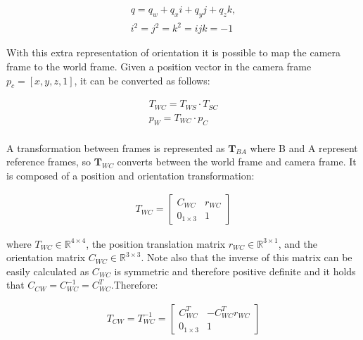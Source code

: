 \documentclass[11pt,twoside]{report}
\begin{document}
\begin{equation}
\begin{aligned}
\label{quaternion}
q = q_{w} + q_{x}i + q_{y}j+q_{z}k, \\
i^{2}=j^{2}=k^{2}=ijk=-1
\end{aligned}
\end{equation}

With this extra representation of orientation it is possible to map the camera frame to the world frame. Given a position vector in the camera frame $p_{c} = [x,y,z,1]$, it can be converted as follows:


\begin{equation}
\begin{aligned}
T_{WC} = T_{WS} \cdot T_{SC} \\
p_{W} = T_{WC} \cdot p_{C} \\
\end{aligned}
\label{matmul_w2c}
\end{equation}

A transformation between frames is represented as $\textbf{T}_{BA}$ where B and A represent reference frames, so $\textbf{T}_{WC}$ converts between the world frame and camera frame. It is composed of a position and orientation transformation:

\begin{equation}
\begin{aligned}
T_{WC} = 
\begin{bmatrix}
C_{WC} & r_{WC} \\
0_{1 \times 3} & 1
\end{bmatrix}
\end{aligned}
\end{equation}

where $T_{WC} \in \mathbb{R}^{4 \times 4}$, the position translation matrix $r_{WC} \in \mathbb{R}^{3 \times 1}$, and the orientation matrix $C_{WC} \in \mathbb{R}^{3 \times 3}$. Note also that the inverse of this matrix can be easily calculated as $C_{WC}$ is symmetric and therefore positive definite and it holds that $C_{CW}=C_{WC}^{-1}= C_{WC}^{T}$.Therefore:

\begin{equation}
\begin{aligned}
T_{CW} = T_{WC}^{-1} = 
\begin{bmatrix}
C_{WC}^{T} & -C_{WC}^{T}r_{WC} \\
0_{1 \times 3} & 1
\end{bmatrix}
\end{aligned}
\label{invert_tmatrix}
\end{equation}
\end{document}
